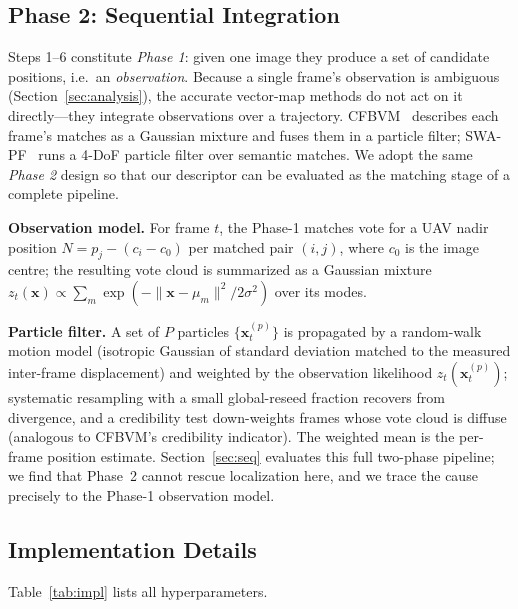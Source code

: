 \documentclass[10pt]{article}
\theoremstyle{plain}
\theoremstyle{definition}
\begin{document}
\subsection{Phase 2: Sequential Integration}
\label{sec:phase2}

Steps 1--6 constitute \emph{Phase 1}: given one image they produce a set of
candidate positions, i.e.\ an \emph{observation}. Because a single frame's
observation is ambiguous (Section~\ref{sec:analysis}), the accurate vector-map
methods do not act on it directly---they integrate observations over a
trajectory. CFBVM~\cite{ouyang2024cfbvm} describes each frame's matches as a
Gaussian mixture and fuses them in a particle filter; SWA-PF~\cite{yuan2025swapf}
runs a 4-DoF particle filter over semantic matches. We adopt the same
\emph{Phase 2} design so that our descriptor can be evaluated as the matching
stage of a complete pipeline.

\noindent\textbf{Observation model.}
For frame $t$, the Phase-1 matches vote for a UAV nadir position
$N = p_j - (c_i - c_0)$ per matched pair $(i,j)$, where $c_0$ is the image
centre; the resulting vote cloud is summarized as a Gaussian mixture
$z_t(\mathbf{x}) \propto \sum_{m} \exp(-\|\mathbf{x}-\mu_m\|^2/2\sigma^2)$ over
its modes.

\noindent\textbf{Particle filter.}
A set of $P$ particles $\{\mathbf{x}^{(p)}_t\}$ is propagated by a random-walk
motion model (isotropic Gaussian of standard deviation matched to the measured
inter-frame displacement) and weighted by the observation likelihood
$z_t(\mathbf{x}^{(p)}_t)$; systematic resampling with a small global-reseed
fraction recovers from divergence, and a credibility test down-weights frames
whose vote cloud is diffuse (analogous to CFBVM's credibility indicator). The
weighted mean is the per-frame position estimate.
Section~\ref{sec:seq} evaluates this full two-phase pipeline; we find that
Phase~2 cannot rescue localization here, and we trace the cause precisely to
the Phase-1 observation model.

\subsection{Implementation Details}
\label{sec:impl}

Table~\ref{tab:impl} lists all hyperparameters.
\end{document}
